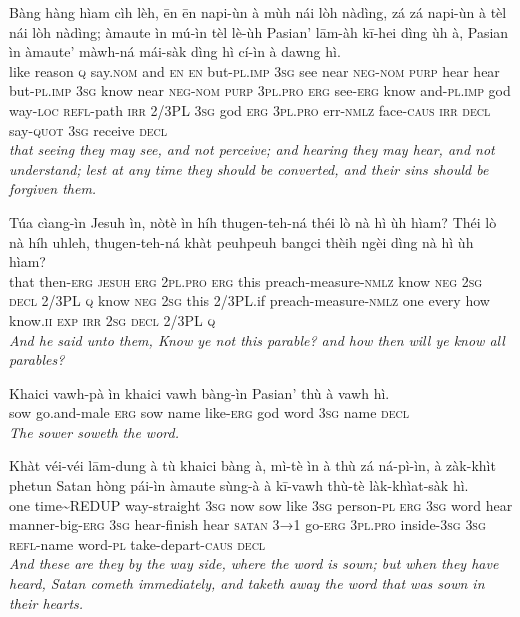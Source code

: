 \documentclass[11pt,a4paper]{article}
\begin{document}
\begin{exe}
\gll Bàng hàng hìam cìh lèh, ēn ēn napi-ùn à mùh nái lòh nàdìng, zá zá napi-ùn à tèl nái lòh nàdìng; àmaute ìn mú-ìn tèl lè-ùh Pasian' lām-àh kī-hei dìng ùh à, Pasian ìn àmaute' màwh-ná mái-sàk dìng hì cí-ìn à dawng hì. \\
     like reason \textsc{q} say.\textsc{nom} and \textsc{en} \textsc{en} but-\textsc{pl}.\textsc{imp} \textsc{3sg} see near \textsc{neg}-\textsc{nom} \textsc{purp} hear hear but-\textsc{pl}.\textsc{imp} \textsc{3sg} know near \textsc{neg}-\textsc{nom} \textsc{purp} \textsc{3pl}.\textsc{pro} \textsc{erg} see-\textsc{erg} know and-\textsc{pl}.\textsc{imp} god way-\textsc{loc} \textsc{refl}-path \textsc{irr} 2/3PL \textsc{3sg} god \textsc{erg} \textsc{3pl}.\textsc{pro} err-\textsc{nmlz} face-\textsc{caus} \textsc{irr} \textsc{decl} say-\textsc{quot} \textsc{3sg} receive \textsc{decl} \\
\glt \textcolor{kjvcolor}{\textit{that seeing they may see, and not perceive; and hearing they may hear, and not understand; lest at any time they should be converted, and their sins should be forgiven them.}}

\gll Túa cìang-ìn Jesuh ìn, nòtè ìn híh thugen-teh-ná théi lò nà hì ùh hìam? Théi lò nà híh uhleh, thugen-teh-ná khàt peuhpeuh bangci thèih ngèi dìng nà hì ùh hìam? \\
     that then-\textsc{erg} \textsc{jesuh} \textsc{erg} \textsc{2pl}.\textsc{pro} \textsc{erg} this preach-measure-\textsc{nmlz} know \textsc{neg} \textsc{2sg} \textsc{decl} 2/3PL \textsc{q} know \textsc{neg} \textsc{2sg} this 2/3PL.if preach-measure-\textsc{nmlz} one every how know.\textsc{ii} \textsc{exp} \textsc{irr} \textsc{2sg} \textsc{decl} 2/3PL \textsc{q} \\
\glt \textcolor{kjvcolor}{\textit{And he said unto them, Know ye not this parable? and how then will ye know all parables?}}

\gll Khaici vawh-pà ìn khaici vawh bàng-ìn Pasian' thù à vawh hì. \\
     sow go.and-male \textsc{erg} sow name like-\textsc{erg} god word \textsc{3sg} name \textsc{decl} \\
\glt \textcolor{kjvcolor}{\textit{The sower soweth the word.}}

\gll Khàt véi-véi lām-dung à tù khaici bàng à, mì-tè ìn à thù zá ná-pì-ìn, à zàk-khìt phetun Satan hòng pái-ìn àmaute sùng-à à kī-vawh thù-tè làk-khìat-sàk hì. \\
     one time\textasciitilde{}REDUP way-straight \textsc{3sg} now sow like \textsc{3sg} person-\textsc{pl} \textsc{erg} \textsc{3sg} word hear manner-big-\textsc{erg} \textsc{3sg} hear-finish hear \textsc{satan} \textsc{3→1} go-\textsc{erg} \textsc{3pl}.\textsc{pro} inside-\textsc{3sg} \textsc{3sg} \textsc{refl}-name word-\textsc{pl} take-depart-\textsc{caus} \textsc{decl} \\
\glt \textcolor{kjvcolor}{\textit{And these are they by the way side, where the word is sown; but when they have heard, Satan cometh immediately, and taketh away the word that was sown in their hearts.}}


\end{exe}
\end{document}
